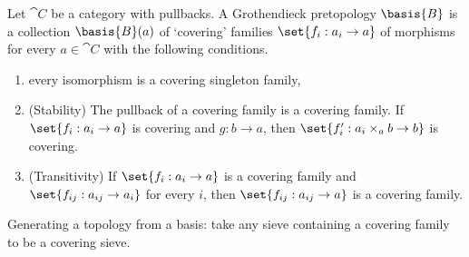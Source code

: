 \begin{definition}[Basis]
Let $\cat{C}$ be a category with pullbacks.
A Grothendieck pretopology $\basis{B}$ is a collection $\basis{B}(a)$ 
of `covering' families $\set{f_i:a_i\rightarrow a}$ of  morphisms 
for every $a\in \cat{C}$ with the following conditions.

\begin{enumerate}
	\item  every isomorphism is a covering singleton family,
	\item (Stability) The pullback of a covering family is a covering family. 
		If  $\set{f_i:a_i\rightarrow a}$ is covering and $g:b\rightarrow a$, then $\set{f'_i:a_i\times_a b\rightarrow b}$ is covering.
	\item (Transitivity) If $\set{f_i:a_i\rightarrow a}$ is a covering family 
		and $\set{ f_{ij}: a_{ij} \rightarrow a_i}$ for every $i$, 
		then $\set{f_{ij}:a_{ij}\rightarrow a}$ is a covering family.
\end{enumerate}

Generating a topology from a basis: take any sieve containing a covering family to be a covering sieve.
\end{definition}